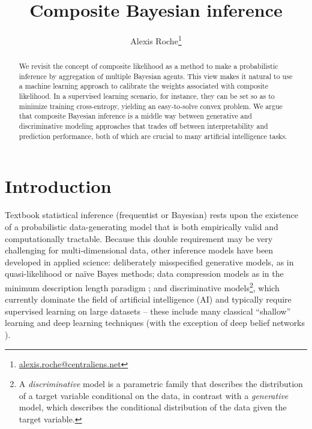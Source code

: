 \documentclass[english]{scrartcl}
\title{Composite Bayesian inference}
\date{}
\author{Alexis Roche\thanks{\url{alexis.roche@centraliens.net}}}
\begin{document}
\maketitle

\begin{abstract}
We revisit the concept of composite likelihood as a method to make a probabilistic inference by aggregation of multiple Bayesian agents. This view makes it natural to use a machine learning approach to calibrate the weights associated with composite likelihood. In a supervised learning scenario, for instance, they can be set so as to minimize training cross-entropy, yielding an easy-to-solve convex problem. We argue that composite Bayesian inference is a middle way between generative and discriminative modeling approaches that trades off between interpretability and prediction performance, both of which are crucial to many artificial intelligence tasks.
\end{abstract}


\section{Introduction}
\label{sec:intro}

Textbook statistical inference (frequentist or Bayesian) rests upon the existence of a probabilistic data-generating model that is both empirically valid and computationally tractable. Because this double requirement may be very challenging for multi-dimensional data, other inference models have been developed in applied science: deliberately misspecified generative models, as in quasi-likelihood \cite{White-82,Walker-13} or na\"ive Bayes \cite{Ng-01} methods; data compression models as in the minimum description length paradigm \cite{Grunwald-07}; and discriminative models\footnote{A {\em discriminative} model is a parametric family that describes the distribution of a target variable conditional on the data, in contrast with a {\em generative} model, which describes the conditional distribution of the data given the target variable.}, which currently dominate the field of artificial intelligence (AI) and typically require supervised learning on large datasets -- these include many classical ``shallow'' learning \cite{Ho-95,BergerA-96,Vapnik-00,Rasmussen-06} and deep learning \cite{Lecun-15,Goodfellow-16} techniques (with the exception of deep belief networks \cite{Hinton-06}).

\end{document}

